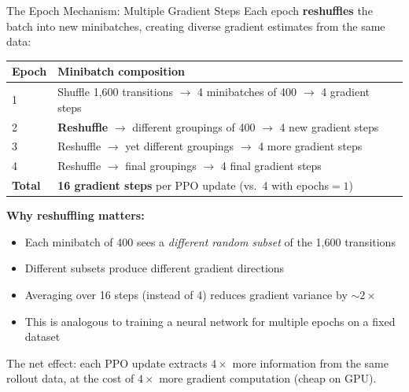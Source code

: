 \documentclass[aspectratio=169,11pt]{beamer}
\begin{document}
\begin{frame}{The Epoch Mechanism: Multiple Gradient Steps}
  \small
  Each epoch \textbf{reshuffles} the batch into new minibatches, creating diverse
  gradient estimates from the same data:

  \medskip
  \begin{center}
  \footnotesize
  \begin{tabular}{lp{9cm}}
    \toprule
    \textbf{Epoch} & \textbf{Minibatch composition} \\
    \midrule
    1 & Shuffle 1{,}600 transitions $\to$ 4 minibatches of 400 $\to$ 4 gradient steps \\
    2 & \textbf{Reshuffle} $\to$ different groupings of 400 $\to$ 4 new gradient steps \\
    3 & Reshuffle $\to$ yet different groupings $\to$ 4 more gradient steps \\
    4 & Reshuffle $\to$ final groupings $\to$ 4 final gradient steps \\
    \midrule
    \textbf{Total} & \textbf{16 gradient steps} per PPO update (vs.\ 4 with epochs${}=1$) \\
    \bottomrule
  \end{tabular}
  \end{center}

  \medskip
  \textbf{Why reshuffling matters:}
  \begin{itemize}\setlength\itemsep{1pt}
    \item Each minibatch of 400 sees a \emph{different random subset} of the 1{,}600 transitions
    \item Different subsets produce different gradient directions
    \item Averaging over 16 steps (instead of 4) reduces gradient variance by $\sim 2\times$
    \item This is analogous to training a neural network for multiple epochs on a fixed dataset
  \end{itemize}

  \medskip
  The net effect: each PPO update extracts $4\times$ more information from the same
  rollout data, at the cost of $4\times$ more gradient computation (cheap on GPU).
\end{frame}
\end{document}

